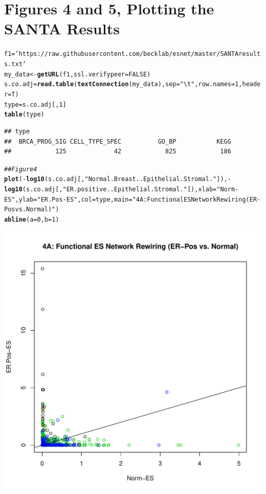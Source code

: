 \documentclass{article}\usepackage[]{graphicx}\usepackage[]{color}
\makeatletter
\def\maxwidth{ %
  \ifdim\Gin@nat@width>\linewidth
    \linewidth
  \else
    \Gin@nat@width
  \fi
}
\newcommand{\hlnum}[1]{\textcolor[rgb]{0.686,0.059,0.569}{#1}}%
\newcommand{\hlstr}[1]{\textcolor[rgb]{0.192,0.494,0.8}{#1}}%
\newcommand{\hlcom}[1]{\textcolor[rgb]{0.678,0.584,0.686}{\textit{#1}}}%
\newcommand{\hlopt}[1]{\textcolor[rgb]{0,0,0}{#1}}%
\newcommand{\hlstd}[1]{\textcolor[rgb]{0.345,0.345,0.345}{#1}}%
\newcommand{\hlkwb}[1]{\textcolor[rgb]{0.69,0.353,0.396}{#1}}%
\newcommand{\hlkwc}[1]{\textcolor[rgb]{0.333,0.667,0.333}{#1}}%
\newcommand{\hlkwd}[1]{\textcolor[rgb]{0.737,0.353,0.396}{\textbf{#1}}}%
\newenvironment{kframe}{%
 \def\at@end@of@kframe{}%
 \ifinner\ifhmode%
  \def\at@end@of@kframe{\end{minipage}}%
  \begin{minipage}{\columnwidth}%
 \fi\fi%
 \def\FrameCommand##1{\hskip\@totalleftmargin \hskip-\fboxsep
 \colorbox{shadecolor}{##1}\hskip-\fboxsep
     \hskip-\linewidth \hskip-\@totalleftmargin \hskip\columnwidth}%
 \MakeFramed {\advance\hsize-\width
   \@totalleftmargin\z@ \linewidth\hsize
   \@setminipage}}%
 {\par\unskip\endMakeFramed%
 \at@end@of@kframe}
\newenvironment{knitrout}{}{} %
\makeatother
\begin{document}
\section{Figures 4 and 5, Plotting the SANTA Results}
\begin{knitrout}
\color{fgcolor}\begin{kframe}
\begin{alltt}
   \hlstd{f1}\hlkwb{=} \hlstr{'https://raw.githubusercontent.com/becklab/esnet/master/SANTAresults.txt'}
\hlstd{my_data} \hlkwb{<-} \hlkwd{getURL}\hlstd{(f1,}\hlkwc{ssl.verifypeer}\hlstd{=}\hlnum{FALSE}\hlstd{)}
\hlstd{s.co.adj}\hlkwb{=}\hlkwd{read.table}\hlstd{(}\hlkwd{textConnection}\hlstd{(my_data),}\hlkwc{sep}\hlstd{=}\hlstr{"\textbackslash{}t"}\hlstd{,}\hlkwc{row.names}\hlstd{=}\hlnum{1}\hlstd{,}\hlkwc{header}\hlstd{=T)}
\hlstd{type}\hlkwb{=}\hlstd{s.co.adj[,}\hlnum{1}\hlstd{]}
\hlkwd{table}\hlstd{(type)}
\end{alltt}
\begin{verbatim}
## type
##  BRCA_PROG_SIG CELL_TYPE_SPEC          GO_BP           KEGG 
##            125             42            825            186
\end{verbatim}
\begin{alltt}
\hlcom{## Figure 4}
\hlkwd{plot}\hlstd{(}\hlopt{-}\hlkwd{log10}\hlstd{(s.co.adj[,}\hlstr{"Normal.Breast..Epithelial.Stromal."}\hlstd{]),}\hlopt{-}\hlkwd{log10}\hlstd{(s.co.adj[,}\hlstr{"ER.positive..Epithelial.Stromal."}\hlstd{]),}\hlkwc{xlab}\hlstd{=}\hlstr{"Norm-ES"}\hlstd{,}\hlkwc{ylab}\hlstd{=}\hlstr{"ER.Pos-ES"}\hlstd{,}\hlkwc{col}\hlstd{=type,} \hlkwc{main} \hlstd{=} \hlstr{"4A: Functional ES Network Rewiring (ER-Pos vs. Normal)"}\hlstd{)}
\hlkwd{abline}\hlstd{(}\hlkwc{a}\hlstd{=}\hlnum{0}\hlstd{,}\hlkwc{b}\hlstd{=}\hlnum{1}\hlstd{)}
\end{alltt}
\end{kframe}
\includegraphics[width=\maxwidth]{figure/Figure_4__Analysis_of_SANTA_Results-1} 

\end{knitrout}
\end{document}
